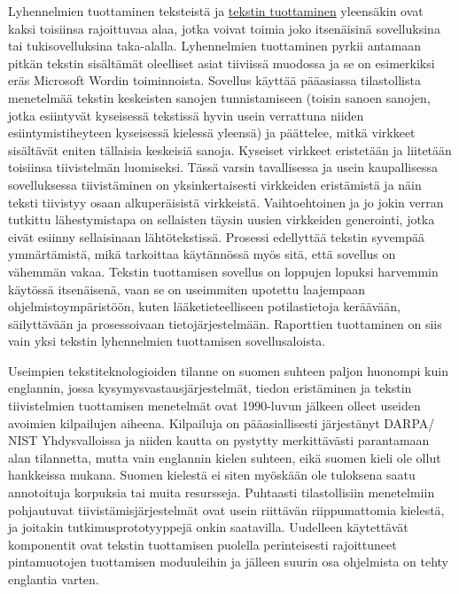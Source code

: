 \documentclass{../../metanetpaper}
\begin{document}
\begin{Parallel}[c]{79mm}{78mm}
{Lyhennelmien tuottaminen teksteistä ja \underline{tekstin tuottaminen}
yleensäkin ovat kaksi toisiinsa rajoittuvaa alaa, jotka voivat toimia joko
itsenäisinä sovelluksina tai tukisovelluksina
taka-alalla. Lyhennelmien tuottaminen pyrkii antamaan pitkän tekstin
sisältämät oleelliset asiat tiiviissä muodossa ja se on esimerkiksi
eräs Microsoft Wordin toiminnoista. Sovellus käyttää pääasiassa
tilastollista menetelmää tekstin keskeisten sanojen tunnistamiseen
(toisin sanoen sanojen, jotka esiintyvät kyseisessä tekstissä hyvin
usein verrattuna niiden esiintymistiheyteen kyseisessä kielessä
yleensä) ja päättelee, mitkä virkkeet sisältävät eniten tällaisia
keskeisiä sanoja. Kyseiset virkkeet eristetään ja liitetään toisiinsa
tiivistelmän luomiseksi. Tässä varsin tavallisessa ja usein
kaupallisessa sovelluksessa tiivistäminen on yksinkertaisesti
virkkeiden eristämistä ja näin teksti tiivistyy osaan alkuperäisistä
virkkeistä. Vaihtoehtoinen ja jo jokin verran tutkittu lähestymistapa
on sellaisten täysin uusien virkkeiden generointi, jotka eivät esiinny
sellaisinaan lähtötekstissä. Prosessi edellyttää tekstin syvempää
ymmärtämistä, mikä tarkoittaa käytännössä myös sitä, että sovellus on
vähemmän vakaa. Tekstin tuottamisen sovellus on loppujen lopuksi
harvemmin käytössä itsenäisenä, vaan se on useimmiten upotettu
laajempaan ohjelmistoympäristöön, kuten lääketieteelliseen
potilastietoja keräävään, säilyttävään ja prosessoivaan
tietojärjestelmään. Raporttien tuottaminen on siis vain yksi tekstin
lyhennelmien tuottamisen sovellusaloista.

Useimpien tekstiteknologioiden tilanne on suomen suhteen paljon
huonompi kuin englannin, jossa kysymysvastausjärjestelmät, tiedon
eristäminen ja tekstin tiivistelmien tuottamisen menetelmät ovat
1990-luvun jälkeen olleet useiden avoimien kilpailujen
aiheena. Kilpailuja on pääasiallisesti järjestänyt DARPA/ NIST
Yhdysvalloissa ja niiden kautta on pystytty merkittävästi parantamaan
alan tilannetta, mutta vain englannin kielen suhteen, eikä suomen
kieli ole ollut hankkeissa mukana. Suomen kielestä ei siten myöskään
ole tuloksena saatu annotoituja korpuksia tai muita
resursseja. Puhtaasti tilastollisiin menetelmiin pohjautuvat
tiivistämisjärjestelmät ovat usein riittävän riippumattomia kielestä,
ja joitakin tutkimusprototyyppejä onkin saatavilla. Uudelleen
käytettävät komponentit ovat tekstin tuottamisen puolella
perinteisesti rajoittuneet pintamuotojen tuottamisen moduuleihin ja
jälleen suurin osa ohjelmista on tehty englantia varten.
}

\end{Parallel}
\end{document}

